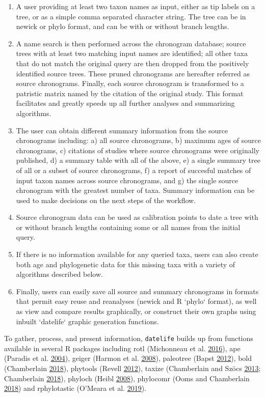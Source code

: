 \documentclass[]{article}
\begin{document}
\begin{enumerate}
\item A user providing at least two taxon names as input, either as tip labels on a tree, or as a simple comma separated character string. The tree can be in newick or phylo format, and can be with or without branch lengths.
\item A name search is then performed across the chronogram database; source trees with at least two matching input names are identified; all other taxa that do not match the original query are then dropped from the positively identified source trees. These pruned chronograms are hereafter referred as source chronograms. Finally, each source chronogram is transformed to a patristic matrix named by the citation of the original study. This format facilitates and greatly speeds up all further analyses and summarizing algorithms.
\item  The user can obtain different summary information from the source chronograms including: a) all source chronograms, b) maximum ages of source chronograms, c) citations of studies where source chronograms were originally published, d) a summary table with all of the above, e) a single summary tree of all or a subset of source chronograms, f) a report of succesful matches of input taxon names across source chronograms, and g) the single source chronogram with the greatest number of taxa. Summary information can be used to make decisions on the next steps of the workflow.
\item  Source chronogram data can be used as calibration points to date a tree with or without branch lengths containing some or all names from the initial query. %
\item  If there is no information available for any queried taxa, users can also create both age and phylogenetic data for this missing taxa with a variety of algorithms described below.
\item  Finally, users can easily save all source and summary chronograms in formats that permit easy reuse and reanalyses (newick and R `phylo` format), as well as view and compare results graphically, or construct their own graphs using inbuilt `datelife` graphic generation functions.
\end{enumerate}

To gather, process, and present information, \texttt{datelife} builds up from functions
available in several R packages including rotl (Michonneau et al. \protect\hyperlink{ref-Michonneau2016}{2016}), ape (Paradis et al. \protect\hyperlink{ref-Paradis2004}{2004}),
geiger (Harmon et al. \protect\hyperlink{ref-Harmon2008}{2008}), paleotree (Bapst \protect\hyperlink{ref-Bapst2012a}{2012}), bold (Chamberlain \protect\hyperlink{ref-Chamberlain2018}{2018}), phytools (Revell \protect\hyperlink{ref-Revell2012}{2012}), taxize (Chamberlain and Szöcs \protect\hyperlink{ref-Chamberlain2013}{2013}; Chamberlain \protect\hyperlink{ref-Chamberlain2018}{2018}), phyloch (Heibl \protect\hyperlink{ref-Heibl2008}{2008}), phylocomr (Ooms and Chamberlain \protect\hyperlink{ref-Ooms2018}{2018}) and rphylotastic (O'Meara et al. \protect\hyperlink{ref-Omeara2019}{2019}).
\end{document}
